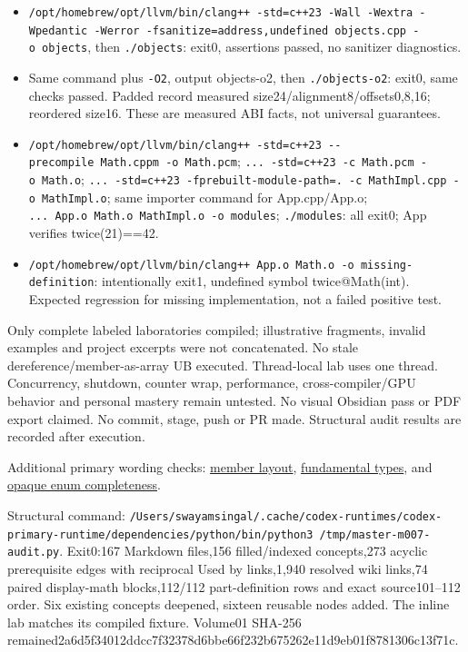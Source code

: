 \begin{itemize}
\tightlist
\item
  \texttt{/opt/homebrew/opt/llvm/bin/clang++\ -std=c++23\ -Wall\ -Wextra\ -Wpedantic\ -Werror\ -fsanitize=address,undefined\ objects.cpp\ -o\ objects}, then \texttt{./objects}: exit0, assertions passed, no sanitizer diagnostics.
\item
  Same command plus \texttt{-O2}, output objects-o2, then \texttt{./objects-o2}: exit0, same checks passed. Padded record measured size24/alignment8/offsets0,8,16; reordered size16. These are measured ABI facts, not universal guarantees.
\item
  \texttt{/opt/homebrew/opt/llvm/bin/clang++\ -std=c++23\ -\/-precompile\ Math.cppm\ -o\ Math.pcm}; \texttt{...\ -std=c++23\ -c\ Math.pcm\ -o\ Math.o}; \texttt{...\ -std=c++23\ -fprebuilt-module-path=.\ -c\ MathImpl.cpp\ -o\ MathImpl.o}; same importer command for App.cpp/App.o; \texttt{...\ App.o\ Math.o\ MathImpl.o\ -o\ modules}; \texttt{./modules}: all exit0; App verifies twice(21)==42.
\item
  \texttt{/opt/homebrew/opt/llvm/bin/clang++\ App.o\ Math.o\ -o\ missing-definition}: intentionally exit1, undefined symbol twice@Math(int). Expected regression for missing implementation, not a failed positive test.
\end{itemize}

Only complete labeled laboratories compiled; illustrative fragments, invalid examples and project excerpts were not concatenated. No stale dereference/member-as-array UB executed. Thread-local lab uses one thread. Concurrency, shutdown, counter wrap, performance, cross-compiler/GPU behavior and personal mastery remain untested. No visual Obsidian pass or PDF export claimed. No commit, stage, push or PR made. Structural audit results are recorded after execution.

Additional primary wording checks: \href{https://eel.is/c++draft/class.mem.general}{member layout}, \href{https://eel.is/c++draft/basic.fundamental}{fundamental types}, and \href{https://eel.is/c++draft/dcl.enum}{opaque enum completeness}.

Structural command: \texttt{/Users/swayamsingal/.cache/codex-runtimes/codex-primary-runtime/dependencies/python/bin/python3\ /tmp/master-m007-audit.py}. Exit0:167 Markdown files,156 filled/indexed concepts,273 acyclic prerequisite edges with reciprocal Used by links,1,940 resolved wiki links,74 paired display-math blocks,112/112 part-definition rows and exact source101--112 order. Six existing concepts deepened, sixteen reusable nodes added. The inline lab matches its compiled fixture. Volume01 SHA-256 remained2a6d5f34012ddcc7f32378d6bbe66f232b675262e11d9eb01f8781306c13f71c.


